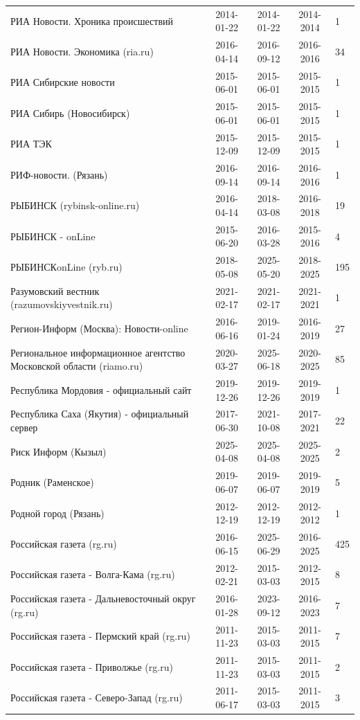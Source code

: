 \begin{longtable}{p{6cm}cccp{2cm}}
РИА Новости. Хроника происшествий & 2014-01-22 & 2014-01-22 & 2014-2014 & 1\\
РИА Новости. Экономика (ria.ru) & 2016-04-14 & 2016-09-12 & 2016-2016 & 34\\
РИА Сибирские новости & 2015-06-01 & 2015-06-01 & 2015-2015 & 1\\
РИА Сибирь (Новосибирск) & 2015-06-01 & 2015-06-01 & 2015-2015 & 1\\
РИА ТЭК & 2015-12-09 & 2015-12-09 & 2015-2015 & 1\\
РИФ-новости. (Рязань) & 2016-09-14 & 2016-09-14 & 2016-2016 & 1\\
РЫБИНСК (rybinsk-online.ru) & 2016-04-14 & 2018-03-08 & 2016-2018 & 19\\
РЫБИНСК - onLine & 2015-06-20 & 2016-03-28 & 2015-2016 & 4\\
РЫБИНСКonLine (ryb.ru) & 2018-05-08 & 2025-05-20 & 2018-2025 & 195\\
Разумовский вестник (razumovskiyvestnik.ru) & 2021-02-17 & 2021-02-17 & 2021-2021 & 1\\
Регион-Информ (Москва): Новости-online & 2016-06-16 & 2019-01-24 & 2016-2019 & 27\\
Региональное информационное агентство Московской области (riamo.ru) & 2020-03-27 & 2025-06-18 & 2020-2025 & 85\\
Республика Мордовия - официальный сайт & 2019-12-26 & 2019-12-26 & 2019-2019 & 1\\
Республика Саха (Якутия) - официальный сервер & 2017-06-30 & 2021-10-08 & 2017-2021 & 22\\
Риск Информ (Кызыл) & 2025-04-08 & 2025-04-08 & 2025-2025 & 2\\
Родник (Раменское) & 2019-06-07 & 2019-06-07 & 2019-2019 & 5\\
Родной город (Рязань) & 2012-12-19 & 2012-12-19 & 2012-2012 & 1\\
Российская газета (rg.ru) & 2016-06-15 & 2025-06-29 & 2016-2025 & 425\\
Российская газета - Волга-Кама (rg.ru) & 2012-02-21 & 2015-03-03 & 2012-2015 & 8\\
Российская газета - Дальневосточный округ (rg.ru) & 2016-01-28 & 2023-09-12 & 2016-2023 & 7\\
Российская газета - Пермский край (rg.ru) & 2011-11-23 & 2015-03-03 & 2011-2015 & 7\\
Российская газета - Приволжье (rg.ru) & 2011-11-23 & 2015-03-03 & 2011-2015 & 2\\
Российская газета - Северо-Запад (rg.ru) & 2011-06-17 & 2015-03-03 & 2011-2015 & 3\\

\end{longtable}
